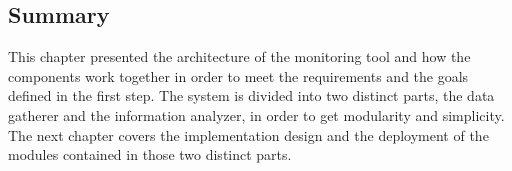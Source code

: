 \subsection{Summary}
This chapter presented the architecture of the monitoring tool and how the components work together in order to meet the requirements and the goals defined in the first step. The system is divided into two distinct parts, the data gatherer and the information analyzer, in order to get modularity and simplicity. The next chapter covers the implementation design and the deployment of the modules contained in those two distinct parts.




